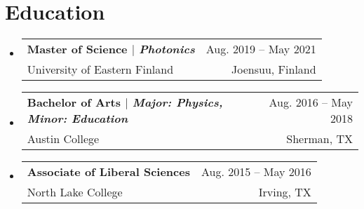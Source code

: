 \documentclass[letterpaper,11pt]{article} %
\makeatletter
\newcommand{\CVSubheading}[4]{
  \vspace{-2pt}\item
    \begin{tabular*}{0.97\textwidth}[t]{l@{\extracolsep{\fill}}r}
      \textbf{#1} & #2 \\
      \small#3 & \small #4 \\
    \end{tabular*}\vspace{-7pt}
}
\newcommand{\CVSubHeadingListStart}{\begin{itemize}[leftmargin=0.5cm, label={}]}
\newcommand{\CVSubHeadingListEnd}{\end{itemize}}
\makeatother
\begin{document}
\begin{comment}
This CV was written for specifically for positions I was applying for in
academia, and then modified to be a template.

A standard CV is about two pages long where as a resume in the US is one page.
sections can be added and removed here with this in mind. In my experience, 
education, and applicable work experience and skills are the most import things
to include on a resume. For a CV the Europass CV suggests the categories: Work
Experience, Education and Training, Language Skills, Digital Skills,
Communication and Interpersonal Skills, Conferences and Seminars, Creative Works
Driver's License, Hobbies and Interests, Honors and Awards, Management and
Leadership Skills, Networks and Memberships, Organizational Skills, Projects,
Publications, Recommendations, Social and Political Activities, Volunteering.

Your goal is to convey a who, what , when, where, why for every item you share. 
The who is obviously you, but I believe the rest should be done in that order.
For example below. An employer cares most about the degree held and typically 
less about the institution or where it is located (This is still good 
information though). Whatever order you choose be consistent throughout.
\end{comment}

\section{Education}
  \CVSubHeadingListStart
    \CVSubheading
      {{Master of Science $|$ \emph{\small{Photonics}}}}{Aug. 2019 -- May 2021}
      {University of Eastern Finland}{Joensuu, Finland}
    \CVSubheading
      {{Bachelor of Arts $|$ \emph{\small{Major: Physics, Minor: Education}}}}{Aug. 2016 -- May 2018}
      {Austin College}{Sherman, TX}
    \CVSubheading
      {Associate of Liberal Sciences}{Aug. 2015 -- May 2016}
      {North Lake College}{Irving, TX}
  \CVSubHeadingListEnd

\begin{comment}
try to briefly explain what you did and why it is relevant to the position you
are seeking
\end{comment}
\end{document}
